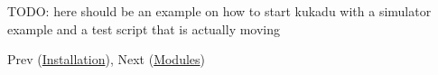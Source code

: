 T\-O\-D\-O\-: here should be an example on how to start kukadu with a simulator example and a test script that is actually moving

Prev (\hyperlink{installationpage}{Installation}), Next (\hyperlink{modulespage}{Modules}) 
